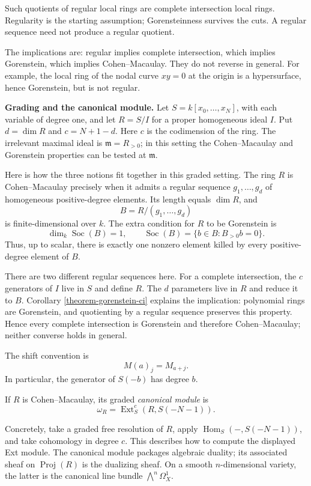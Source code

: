 Such quotients of regular local rings
are complete intersection local rings.
Regularity is the starting assumption;
Gorensteinness survives the cuts.
A regular sequence need not produce
a regular quotient.

The implications are: regular implies
complete intersection, which implies
Gorenstein, which implies Cohen--Macaulay.
They do not reverse in general.
For example, the local ring of the nodal
curve $xy=0$ at the origin is a hypersurface,
hence Gorenstein, but is not regular.

\medskip\noindent
{\bf Grading and the canonical module.}
Let $S=k[x_0,\ldots,x_N]$, with each
variable of degree one, and let $R=S/I$
for a proper homogeneous ideal $I$.
Put $d=\dim R$ and $c=N+1-d$.
Here $c$ is the codimension of the ring.
The irrelevant maximal ideal is
$\mathfrak m=R_{>0}$; in this setting the
Cohen--Macaulay and Gorenstein properties
can be tested at $\mathfrak m$.

Here is how the three notions fit together
in this graded setting. The ring $R$ is
Cohen--Macaulay precisely when it admits
a regular sequence $g_1,\ldots,g_d$ of
homogeneous positive-degree elements.
Its length equals $\dim R$, and
$$
B=R/(g_1,\ldots,g_d)
$$
is finite-dimensional over $k$.
The extra condition for $R$ to be
Gorenstein is
$$
\dim_k\operatorname{Soc}(B)=1,
\qquad
\operatorname{Soc}(B)
=\{b\in B:B_{>0}b=0\}.
$$
Thus, up to scalar, there is exactly one
nonzero element killed by every
positive-degree element of $B$.

There are two different regular sequences
here. For a complete intersection, the
$c$ generators of $I$ live in $S$ and
define $R$. The $d$ parameters live in
$R$ and reduce it to $B$.
Corollary \ref{theorem-gorenstein-ci}
explains the implication: polynomial
rings are Gorenstein, and quotienting by
a regular sequence preserves this property.
Hence every complete intersection is
Gorenstein and therefore Cohen--Macaulay;
neither converse holds in general.

The shift convention is
$$
M(a)_j=M_{a+j}.
$$
In particular, the generator of $S(-b)$
has degree $b$.

\begin{definition}
\label{definition-canonical-module-graded}
If $R$ is Cohen--Macaulay, its graded
{\it canonical module} is
$$
\omega_R
=\operatorname{Ext}^{c}_S(R,S(-N-1)).
$$
\end{definition}

Concretely, take a graded free resolution of
$R$, apply $\operatorname{Hom}_S(-,S(-N-1))$,
and take cohomology in degree $c$.
This describes how to compute the displayed
Ext module. The canonical module packages
algebraic duality; its associated sheaf on
$\operatorname{Proj}(R)$ is the dualizing
sheaf. On a smooth $n$-dimensional variety,
the latter is the canonical line bundle
$\bigwedge^n\Omega^1_X$.

